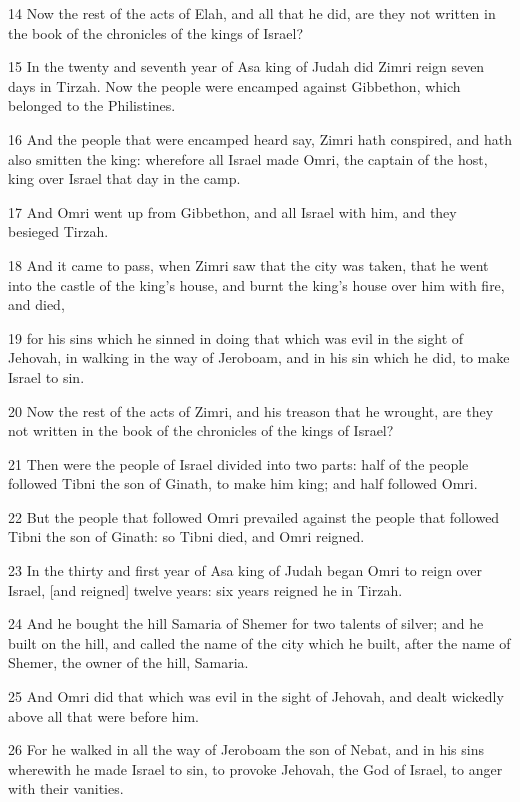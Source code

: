 \par 14 Now the rest of the acts of Elah, and all that he did, are they not written in the book of the chronicles of the kings of Israel?
\par 15 In the twenty and seventh year of Asa king of Judah did Zimri reign seven days in Tirzah. Now the people were encamped against Gibbethon, which belonged to the Philistines.
\par 16 And the people that were encamped heard say, Zimri hath conspired, and hath also smitten the king: wherefore all Israel made Omri, the captain of the host, king over Israel that day in the camp.
\par 17 And Omri went up from Gibbethon, and all Israel with him, and they besieged Tirzah.
\par 18 And it came to pass, when Zimri saw that the city was taken, that he went into the castle of the king's house, and burnt the king's house over him with fire, and died,
\par 19 for his sins which he sinned in doing that which was evil in the sight of Jehovah, in walking in the way of Jeroboam, and in his sin which he did, to make Israel to sin.
\par 20 Now the rest of the acts of Zimri, and his treason that he wrought, are they not written in the book of the chronicles of the kings of Israel?
\par 21 Then were the people of Israel divided into two parts: half of the people followed Tibni the son of Ginath, to make him king; and half followed Omri.
\par 22 But the people that followed Omri prevailed against the people that followed Tibni the son of Ginath: so Tibni died, and Omri reigned.
\par 23 In the thirty and first year of Asa king of Judah began Omri to reign over Israel, [and reigned] twelve years: six years reigned he in Tirzah.
\par 24 And he bought the hill Samaria of Shemer for two talents of silver; and he built on the hill, and called the name of the city which he built, after the name of Shemer, the owner of the hill, Samaria.
\par 25 And Omri did that which was evil in the sight of Jehovah, and dealt wickedly above all that were before him.
\par 26 For he walked in all the way of Jeroboam the son of Nebat, and in his sins wherewith he made Israel to sin, to provoke Jehovah, the God of Israel, to anger with their vanities.
